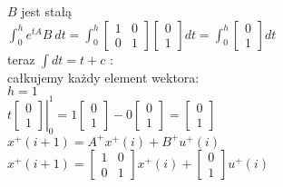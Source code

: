 $B$ jest stałą\\
{\color{red}
}
$\int^h_0e^{tA}B\ dt=\int^h_0 \left[ \begin{array}{cc}   1&0\\0&1    \end{array}\right]\left[ \begin{array}{c}    0\\1    \end{array}\right]dt=\int^h_0 \left[ \begin{array}{c}    0\\1    \end{array}\right]dt$\\
teraz $\int dt = t + c$ :\\ 
całkujemy każdy element wektora:\\
$h=1$\\
$t\left.\left[ \begin{array}{c}    0\\1    \end{array}\right]\right|^1_0 = 1\left[ \begin{array}{c}    0\\1 \end{array}\right]-0\left[ \begin{array}{c}    0\\1    \end{array}\right]=\left[ \begin{array}{c}    0\\1    \end{array}\right]$\\
$x^+(i+1)=A^+x^+(i)+B^+u^+(i)$\\
$x^+(i+1)=\left[ \begin{array}{cc}    1&0\\0&1    \end{array}\right]x^+(i)+\left[ \begin{array}{c}    0\\1    \end{array}\right]u^+(i)$\\


